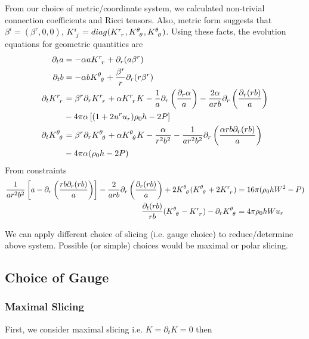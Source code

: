 \documentclass[prd]{revtex4}
\begin{document}
From our choice of metric/coordinate system, we calculated non-trivial connection coefficients and Ricci tensors. Also, metric form suggests that $\beta^i = (\beta^r,0,0)$, $K\indices{^i_j} = diag(K\indices{^r_r}, K\indices{^\theta_\theta},K\indices{^\theta_\theta})$. Using these facts, the evolution equations for geometric quantities are
\begin{align}
\partial_t a &= - \alpha a K\indices{^r_r} + \partial_r (a \beta^r) \\
\partial_t b &= - \alpha b K\indices{^\theta_\theta} + \frac{\beta^r}{r} \partial_r (r \beta^r) \\
\partial_t K\indices{^r_r} &= \beta^r \partial_r K\indices{^r_r} + \alpha K\indices{^r_r} K - \frac{1}{a} \partial_r \left( \frac{\partial_r \alpha}{a} \right) - \frac{2 \alpha}{arb} \partial_r \left( \frac{\partial_r (rb)}{a} \right) \nonumber \\
& - 4 \pi \alpha \left[ (1+2 u^r u_r) \rho_0 h - 2P \right] \\
\partial_t K\indices{^\theta_\theta} &= \beta^r \partial_r K\indices{^\theta_\theta} + \alpha K\indices{^\theta_\theta} K - \frac{\alpha}{r^2 b^2} - \frac{1}{ar^2b^2} \partial_r \left( \frac{\alpha r b \partial_r (rb)}{a} \right) \nonumber \\
& - 4 \pi \alpha (\rho_0 h -2 P)
\end{align}
From constraints
\begin{align}
 \frac{1}{ar^2b^2} \left[a-\partial_r \left(\frac{rb \partial_r (rb)}{a} \right) \right] -\frac{2}{arb} \partial_r \left(\frac{\partial_r (rb)}{a} \right) + 2K\indices{^\theta_\theta}(K\indices{^\theta_\theta}+2 K\indices{^r_r}) &= 16 \pi (\rho_0 h W^2 -P) \nonumber \\
 \frac{\partial_t (r b)}{rb} (K\indices{^\theta_\theta} - K\indices{^r_r}) - \partial_r K\indices{^\theta_\theta} &= 4 \pi \rho_0 h W u_r
\end{align}


We can apply different choice of slicing (i.e. gauge choice) to reduce/determine above system. Possible (or simple) choices would be maximal or polar slicing. 

\subsection{Choice of Gauge}

\subsubsection{Maximal Slicing}
First, we consider maximal slicing i.e. $K=\partial_t K = 0$ then 
\end{document}
